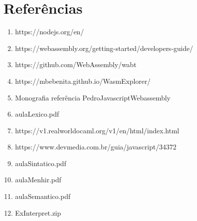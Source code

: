 \documentclass[12pt,a4paper,twoside]{article}
\begin{document}

\newpage
{}
\section*{Referências}
    \begin{enumerate}
        \item {} https://nodejs.org/en/
        
        \item {} https://webassembly.org/getting-started/developers-guide/
        
        \item {}https://github.com/WebAssembly/wabt
        
        \item {}https://mbebenita.github.io/WasmExplorer/
        
       \item {}Monografia referência PedroJavascriptWebassembly
       
       \item {}aulaLexico.pdf
       
       \item {}https://v1.realworldocaml.org/v1/en/html/index.html
        \item {} https://www.devmedia.com.br/guia/javascript/34372
    
        \item {}aulaSintatico.pdf
        \item {}aulaMenhir.pdf
        
        \item {}aulaSemantico.pdf
        
       \item {}ExInterpret.zip
    
    \end{enumerate}

\end{document}
